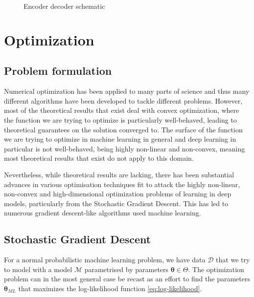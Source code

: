 \begin{figure}[H]
    \caption{Encoder decoder schematic}
  \label{fig:encoder_decoder}
\end{figure}

\section{Optimization}

\subsection{Problem formulation}

Numerical optimization has been applied to many parts of science and thus many
different algorithms have been developed to tackle different problems. However,
most of the theoretical results that exist deal with convex optimization, where
the function we are trying to optimize is particularly well-behaved, leading to
theoretical guarantees on the solution converged to. The surface of the function
we are trying to optimize in machine learning in general and deep learning in
particular is not well-behaved, being highly non-linear and non-convex, meaning
most theoretical results that exist do not apply to this domain\cite{choromanska_loss_2014}.

Nevertheless, while theoretical results are lacking, there has been substantial
advances in various optimisation techniques fit to attack the highly non-linear,
non-convex and high-dimensional optimization problems of learning in deep
models, particularly from the Stochastic Gradient Descent. This has led to
numerous gradient descent-like algorithms used machine learning\cite{Ruder17}.

\subsection{Stochastic Gradient Descent}

For a normal probabilistic machine learning problem, we have data $\mathcal{D}$
that we try to model with a model $\mathcal{M}$ parametrised by parameters
$\bm{\theta} \in \Theta$. The optimization problem can in the most general case be recast
as an effort to find the parameters $\bm{\theta}_{ML}$ that maximizes the
log-likelihood function \eqref{eq:log-likelihood}.

